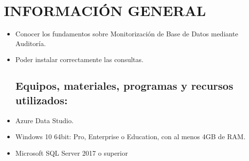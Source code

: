 \section{INFORMACIÓN GENERAL} 

\begin{itemize}
\subsection{Objetivos:}
	\item Conocer los fundamentos sobre Monitorización de Base de Datos mediante Auditoría.
	\item Poder instalar correctamente  las consultas.
\subsection{Equipos, materiales, programas y recursos utilizados:}
	\item Azure Data Studio.
	\item Windows 10 64bit: Pro, Enterprise o Education, con al menos 4GB de RAM.
	\item Microsoft SQL Server 2017 o superior

\end{itemize}
